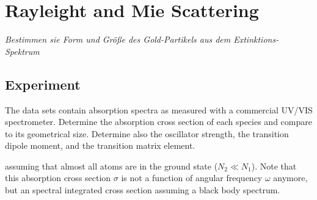 

\chapter{Rayleight and Mie Scattering}


\textit{Bestimmen sie Form und Größe des Gold-Partikels aus dem Extinktions-Spektrum
}

\section{Experiment}

The data sets contain absorption spectra as measured with a commercial UV/VIS spectrometer. Determine the absorption cross section of each species and compare to its geometrical size. Determine also the oscillator strength, the transition dipole moment, and the transition matrix element.

assuming that almost all atoms are in the ground state ($N_2 \ll N_1$). Note that this absorption cross section $\sigma$ is not a function of angular frequency $\omega$ anymore, but an spectral integrated cross section assuming a black body spectrum.





\printbibliography[segment=\therefsegment,heading=subbibliography]
